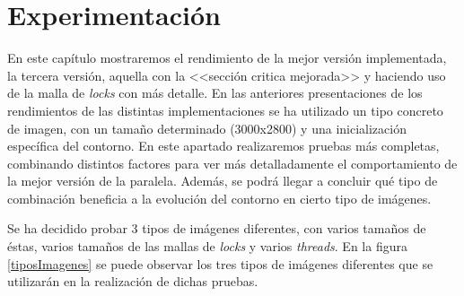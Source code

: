 \chapter{Experimentaci\'{o}n}

En este cap\'{i}tulo mostraremos el rendimiento de la mejor versi\'{o}n implementada, la tercera versi\'{o}n, aquella con la <<secci\'{o}n critica mejorada>> y haciendo uso de la malla de \textit{locks} con m\'{a}s detalle. En las anteriores presentaciones de los rendimientos de las distintas implementaciones se ha utilizado un tipo concreto de imagen, con un tama\~{n}o determinado (3000x2800) y una inicializaci\'{o}n espec\'{i}fica del contorno. En este apartado realizaremos pruebas m\'{a}s completas, combinando distintos factores para ver m\'{a}s detalladamente el comportamiento de la mejor versi\'{o}n de la paralela. Adem\'{a}s, se podr\'{a} llegar a concluir qu\'{e} tipo de combinaci\'{o}n beneficia a la evoluci\'{o}n del contorno en cierto tipo de im\'{a}genes.

Se ha decidido probar 3 tipos de im\'{a}genes diferentes, con varios tama\~{n}os de \'{e}stas, varios tama\~{n}os de las mallas de \textit{locks} y varios \textit{threads}. En la figura \ref{tiposImagenes} se puede observar los tres tipos de im\'{a}genes diferentes que se utilizar\'{a}n en la realizaci\'{o}n de dichas pruebas.


